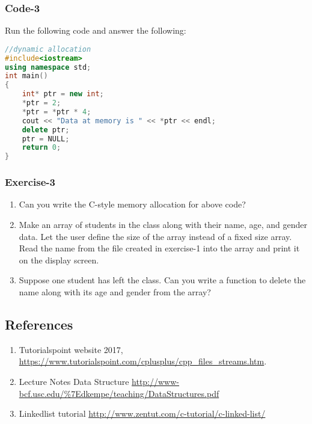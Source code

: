 \documentclass{article}
\begin{document}
\subsubsection*{Code-3}
Run the following code and answer the following:

\begin{lstlisting}[language=C++]
//dynamic allocation
#include<iostream>
using namespace std;
int main()
{
	int* ptr = new int;
	*ptr = 2;
	*ptr = *ptr * 4;
	cout << "Data at memory is " << *ptr << endl;
	delete ptr;
	ptr = NULL;
	return 0;
}
\end{lstlisting}

\subsubsection*{Exercise-3}
\begin{enumerate}
\item Can you write the C-style memory allocation for above code?
\item Make an array of students in the class along with their name, age, and gender data. Let the user define the size of the array instead of a fixed size array. Read the name from the file created in exercise-1 into the array and print it on the display screen.
\item Suppose one student has left the class. Can you write a function to delete the name along with its age and gender from the array?
\end{enumerate}



\subsection*{References}
\begin{enumerate}
\item Tutorialspoint website 2017, 
\url{https://www.tutorialspoint.com/cplusplus/cpp_files_streams.htm}.
\item Lecture Notes Data Structure \url{http://www-bcf.usc.edu/\%7Edkempe/teaching/DataStructures.pdf}
\item Linkedlist tutorial \url{http://www.zentut.com/c-tutorial/c-linked-list/}
\end{enumerate}
\end{document}
